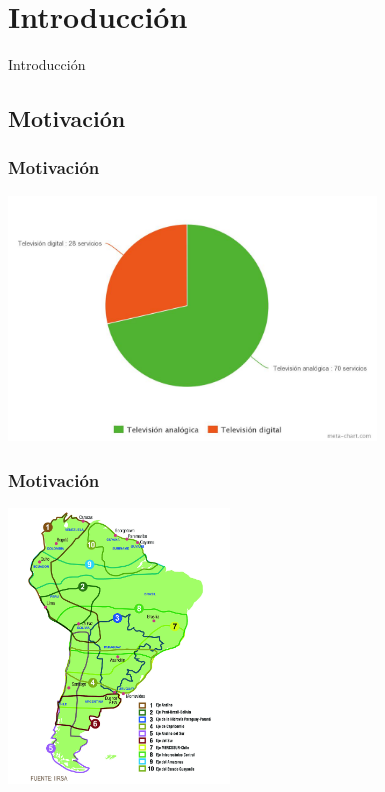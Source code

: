 \documentclass[a4paper,11pt]{beamer}
\begin{document}



\section{Introducción}

\begin{frame}

\begin{center}
\Huge Introducción
\end{center}

\end{frame}
		

	\subsection{Motivación}
		\begin{frame}
			\frametitle{Motivación}
			\includegraphics[height=6.5cm]{numero_servicios_vs.jpeg}
		\end{frame}

		\begin{frame}
			\frametitle{Motivación}
			\begin{center}
			\includegraphics[height=7.3cm]{unasur.jpg}
			\end{center}
		\end{frame}
\end{document}
